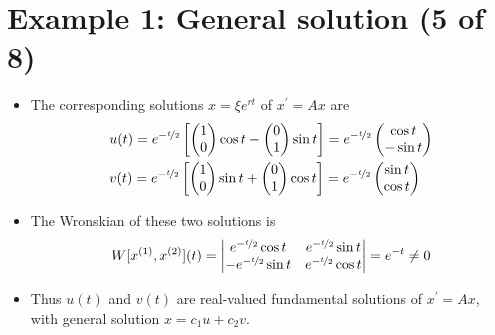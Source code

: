 \documentclass[11pt,a4paper]{article}
\begin{document}
	\section*{Example 1: General solution (5 of 8)}
	\begin{itemize}
		\item The corresponding solutions $x = \xi e^{rt}$ of $x^\prime = Ax$ are
		\begin{align*}
			&u(t) = e^{-\nicefrac{t}{2}}
			\left[
			\begin{pmatrix}
				1\\
				0
			\end{pmatrix}\cos t -
			\begin{pmatrix}
				0\\
				1
			\end{pmatrix}\sin t
			\right]=e^{-\nicefrac{t}{2}}
			\begin{pmatrix}
				\cos t\\
				-\sin t
			\end{pmatrix}\\
			&v(t) = e^{-\nicefrac{t}{2}}
			\left[
			\begin{pmatrix}
				1\\
				0
			\end{pmatrix}\sin t +
			\begin{pmatrix}
				0\\
				1
			\end{pmatrix}\cos t
			\right]= e^{-\nicefrac{t}{2}}
			\begin{pmatrix}
				\sin t\\
				\cos t
			\end{pmatrix}
		\end{align*}
		\item The Wronskian of these two solutions is
		$$
		W[x^{(1)}, x^{(2)}](t) =
		\begin{vmatrix}
			e^{-\nicefrac{t}{2}}\cos t & e^{-\nicefrac{t}{2}}\sin t\\
			-e^{-\nicefrac{t}{2}}\sin t & e^{-\nicefrac{t}{2}}\cos t
		\end{vmatrix}=e^{-t} \neq 0
		$$
		\item Thus $u(t)$ and $v(t)$ are real-valued fundamental solutions of $x^\prime = Ax$, with general solution $x = c_1u + c_2v$.
	\end{itemize}
\end{document}

